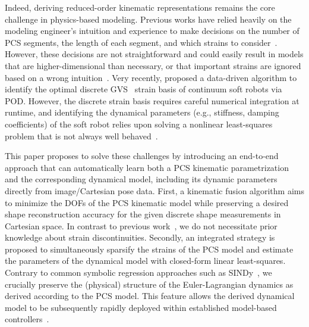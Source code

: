 %
Indeed, deriving reduced-order kinematic representations remains the core challenge in physics-based modeling. 
%
Previous works have relied heavily on the modeling engineer's intuition and experience to make decisions on the number of \gls{PCS} segments, the length of each segment, and which strains to consider~\citep{toshimitsu2021sopra}. However, these decisions are not straightforward and could easily result in models that are higher-dimensional than necessary, or that important strains are ignored based on a wrong intuition~\citep{garg2022kinematic}.
Very recently, \citet{alkayas2025soft} proposed a data-driven algorithm to identify the optimal discrete \gls{GVS}~\cite{boyer2020dynamics} strain basis of continuum soft robots via \gls{POD}. 
However, the discrete strain basis requires careful numerical integration at runtime, and identifying the dynamical parameters (e.g., stiffness, damping coefficients) of the soft robot relies upon solving a nonlinear least-squares problem that is not always well behaved~\citep{stolzle2024experimental}.

This paper proposes to solve these challenges by introducing an end-to-end approach that can automatically learn both a \gls{PCS} kinematic parametrization and the corresponding dynamical model, including its dynamic parameters directly from image/Cartesian pose data.
First, a kinematic fusion algorithm aims to minimize the \glspl{DOF} of the \gls{PCS} kinematic model while preserving a desired shape reconstruction accuracy for the given discrete shape measurements in Cartesian space. In contrast to previous work~\citep{alkayas2025soft}, we do not necessitate prior knowledge about strain discontinuities.
Secondly, an integrated strategy is proposed to simultaneously sparsify the strains of the \gls{PCS} model and estimate the parameters of the dynamical model with closed-form linear least-squares.
Contrary to common symbolic regression approaches such as \gls{SINDy}~\citep{kaiser2018sparse}, we crucially preserve the (physical) structure of the Euler-Lagrangian dynamics as derived according to the \gls{PCS} model.
This feature allows the derived dynamical model to be subsequently rapidly deployed within established model-based controllers~\citep{della2023model}.


